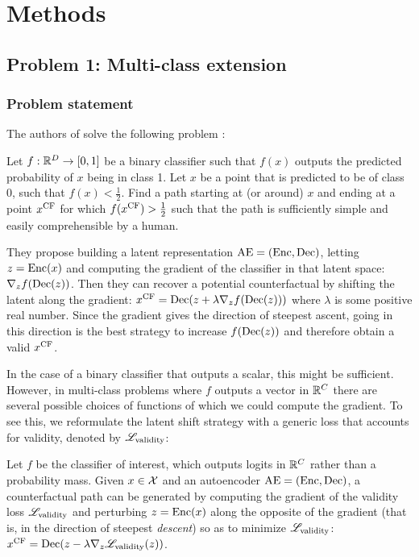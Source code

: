 \documentclass[../main.tex]{subfiles}
\begin{document}
\chapter{Methods}
\label{ch:methods}

\section{Problem 1: Multi-class extension}

\subsection{Problem statement}

The authors of \ls{} solve the following problem \cite{cohenGifsplanation2022}:

Let $f: \mathbb{R}^D \to [0, 1]$ be a binary classifier such that $f(x)$ outputs the predicted probability of $x$ being in class 1.
Let $x$ be a point that is predicted to be of class 0, \ie{} such that $f(x) < \frac{1}{2}$.
Find a path starting at (or around) $x$ and ending at a point $x^\text{CF}$ for which $f(x^\text{CF}) > \frac{1}{2}$ such that the path is sufficiently simple and easily comprehensible by a human.

They propose building a latent representation $\mathrm{AE} = (\operatorname{Enc}, \operatorname{Dec})$, letting $z = \operatorname{Enc}(x)$ and computing the gradient of the classifier in that latent space:
$\nabla_z f(\operatorname{Dec}(z))$.
Then they can recover a potential counterfactual by shifting the latent along the gradient: $x^\text{CF} = \operatorname{Dec}(z + \lambda \nabla_z f(\operatorname{Dec}(z)))$ where $\lambda$ is some positive real number.
Since the gradient gives the direction of steepest ascent, going in this direction is the best strategy to increase $f(\operatorname{Dec}(z))$ and therefore obtain a valid $x^\text{CF}$.

In the case of a binary classifier that outputs a scalar, this might be sufficient. However, in multi-class problems where $f$ outputs a vector in $\mathbb{R}^C$ there are several possible choices of functions of which we could compute the gradient.
To see this, we reformulate the latent shift strategy with a generic loss that accounts for validity, denoted by $\mathscr{L}_\text{validity}$:

Let $f$ be the classifier of interest, which outputs logits in $\mathbb{R}^C$ rather than a probability mass.
Given $x \in \mathcal{X}$ and an autoencoder $\mathrm{AE} = (\operatorname{Enc}, \operatorname{Dec})$, a counterfactual path can be generated by computing the gradient of the validity loss $\mathscr{L}_\text{validity}$ and perturbing $z = \operatorname{Enc}(x)$ along the opposite of the gradient (that is, in the direction of steepest \emph{descent}) so as to minimize $\mathscr{L}_\text{validity}$:
$x^\text{CF} = \operatorname{Dec}(z - \lambda \nabla_z \mathscr{L}_\text{validity}(z))$.
\end{document}
